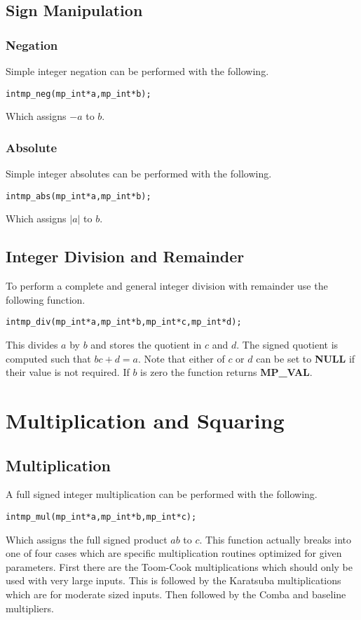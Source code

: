 \documentclass[synpaper]{book}
\begin{document}
\section{Sign Manipulation}
\subsection{Negation}
\label{sec:NEG}
Simple integer negation can be performed with the following.

\begin{alltt}
int mp_neg (mp_int * a, mp_int * b);
\end{alltt}

Which assigns $-a$ to $b$.

\subsection{Absolute}
Simple integer absolutes can be performed with the following.

\begin{alltt}
int mp_abs (mp_int * a, mp_int * b);
\end{alltt}

Which assigns $\vert a \vert$ to $b$.

\section{Integer Division and Remainder}
To perform a complete and general integer division with remainder use the following function.

\begin{alltt}
int mp_div (mp_int * a, mp_int * b, mp_int * c, mp_int * d);
\end{alltt}

This divides $a$ by $b$ and stores the quotient in $c$ and $d$.  The signed quotient is computed such that
$bc + d = a$.  Note that either of $c$ or $d$ can be set to \textbf{NULL} if their value is not required.  If
$b$ is zero the function returns \textbf{MP\_VAL}.


\chapter{Multiplication and Squaring}
\section{Multiplication}
A full signed integer multiplication can be performed with the following.
\begin{alltt}
int mp_mul (mp_int * a, mp_int * b, mp_int * c);
\end{alltt}
Which assigns the full signed product $ab$ to $c$.  This function actually breaks into one of four cases which are
specific multiplication routines optimized for given parameters.  First there are the Toom-Cook multiplications which
should only be used with very large inputs.  This is followed by the Karatsuba multiplications which are for moderate
sized inputs.  Then followed by the Comba and baseline multipliers.
\end{document}
